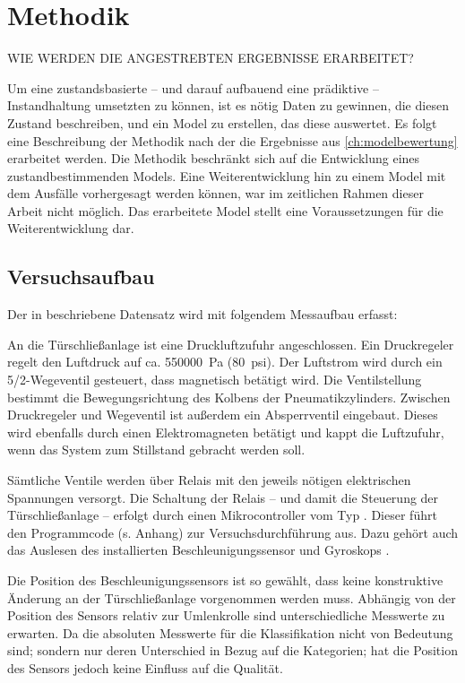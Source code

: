 \chapter{Methodik}
\label{ch:methodik}

WIE WERDEN DIE ANGESTREBTEN ERGEBNISSE ERARBEITET?

Um eine zustandsbasierte -- und darauf aufbauend eine prädiktive -- Instandhaltung umsetzten zu können, ist es nötig Daten zu gewinnen, die diesen Zustand beschreiben, und ein Model zu erstellen, das diese auswertet. Es folgt eine Beschreibung der Methodik nach der die Ergebnisse aus \cref{ch:modelbewertung} erarbeitet werden. Die Methodik beschränkt sich auf die Entwicklung eines zustandbestimmenden Models. Eine Weiterentwicklung hin zu einem Model mit dem Ausfälle vorhergesagt werden können, war im zeitlichen Rahmen dieser Arbeit nicht möglich. Das erarbeitete Model stellt eine Voraussetzungen für die Weiterentwicklung dar. 

\section{Versuchsaufbau}
\label{sec:versuchsaufbau}
Der in  beschriebene Datensatz wird mit folgendem Messaufbau erfasst:

An die Türschließanlage ist eine Druckluftzufuhr angeschlossen. Ein Druckregeler regelt den Luftdruck auf ca. \SI{550000}{\pascal} (\SI{80}{psi}). Der Luftstrom wird durch ein 5/2-Wegeventil gesteuert, dass magnetisch betätigt wird. Die Ventilstellung bestimmt die Bewegungsrichtung des Kolbens der Pneumatikzylinders. Zwischen Druckregeler und Wegeventil ist außerdem ein Absperrventil eingebaut. Dieses wird ebenfalls durch einen Elektromagneten betätigt und kappt die Luftzufuhr, wenn das System zum Stillstand gebracht werden soll.

Sämtliche Ventile werden über Relais mit den jeweils nötigen elektrischen Spannungen versorgt. Die Schaltung der Relais -- und damit die Steuerung der Türschließanlage -- erfolgt durch einen Mikrocontroller vom Typ . Dieser führt den Programmcode (s. Anhang) zur Versuchsdurchführung aus.  Dazu gehört auch das Auslesen des installierten Beschleunigungssensor und Gyroskops . 

Die Position des Beschleunigungssensors ist so gewählt, dass keine konstruktive Änderung an der Türschließanlage vorgenommen werden muss. Abhängig von der Position des Sensors relativ zur Umlenkrolle sind unterschiedliche Messwerte zu erwarten. Da die absoluten Messwerte für die Klassifikation nicht von Bedeutung sind; sondern nur deren Unterschied in Bezug auf die Kategorien; hat die Position des Sensors jedoch keine Einfluss auf die Qualität.

